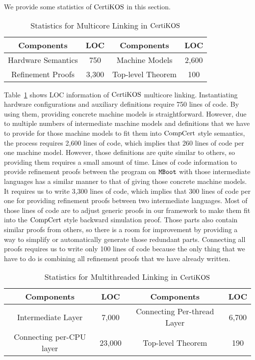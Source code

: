 We provide some statistics of $\mathrm{CertiKOS}$ in this section. 
\begin{table}
\begin{center}
\renewcommand{\arraystretch}{1.1}
\setlength{\tabcolsep}{0.3em}
\begin{tabular}{|c|c||c|c|}
\hline
Components  & LOC & Components  & LOC \\
\hline
\hline
Hardware Semantics & 750 &
Machine Models & 2,600 \\ 
\hline
Refinement Proofs & 3,300 & Top-level Theorem & 100\\ 
\hline
\end{tabular}
\end{center}
\caption{Statistics for Multicore Linking in $\mathrm{CertiKOS}$}
\label{table:multicore-evaluation}
\hrulefill
\end{table}
Table~\ref{table:multicore-evaluation} shows LOC information of $\mathrm{CertiKOS}$ multicore linking.
Instantiating hardware configurations and auxiliary definitions require 750 lines of code. 
By using them, providing concrete machine models is straightforward.
However, due to multiple numbers of intermediate machine models and  definitions that we have to provide for those machine models to fit them into $\mathrm{CompCert}$ style semantics, the process requires 2,600 lines of code, which implies that 260 lines of code per one machine model.
However, those definitions are quite similar to others, so providing them requires a small amount of time. 
Lines of code information to provide refinement proofs between the program on ${\mathrm{\texttt{MBoot}}}$ with those intermediate languages has a similar manner to that of giving those concrete machine models. 
It requires us to write 3,300 lines of code, which implies that 300 lines of code per one for providing refinement proofs between two intermediate languages. 
Most of those lines of code are to adjust generic proofs in our framework to make them fit into the $\mathrm{CompCert}$ style backward simulation proof. 
Those parts also contain similar proofs from others, so there is a room for improvement by providing a way to simplify or automatically generate those redundant parts. 
Connecting all proofs requires us to write only 100 lines of code because the only thing that we have to do is combining all refinement proofs that we have already written. 
\begin{table}
\begin{center}
\renewcommand{\arraystretch}{1.1}
\setlength{\tabcolsep}{0.3em}
\begin{tabular}{|c|c||c|c|}
\hline
Components  & LOC & Components  & LOC \\
\hline
\hline
Intermediate Layer & 7,000 &
Connecting Per-thread Layer & 6,700 \\ 
\hline
Connecting per-CPU layer & 23,000 & Top-level Theorem & 190\\ 
\hline
\end{tabular}
\end{center}
\caption{Statistics for Multithreaded Linking in $\mathrm{CertiKOS}$}
\label{table:multithreaded-evaluation}
\hrulefill
\end{table}
